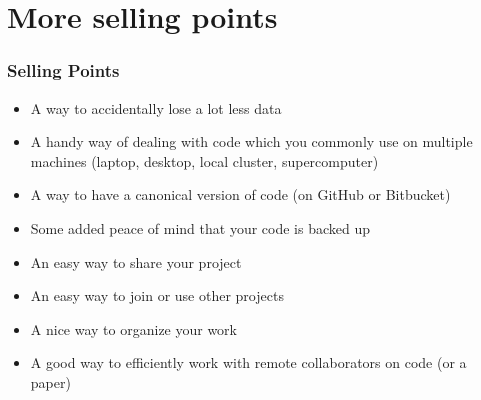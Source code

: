\documentclass{beamer}
\begin{document}
\section{More selling points}
\begin{frame}[fragile]
\frametitle{Selling Points}
\begin{itemize}
\item A way to accidentally lose a lot less data
\item A handy way of dealing with code which you commonly use on multiple machines (laptop, desktop, local cluster, supercomputer)
\item A way to have a canonical version of code (on GitHub or Bitbucket)
\item Some added peace of mind that your code is backed up
\item An easy way to share your project
\item An easy way to join or use other projects
\item A nice way to organize your work
\item A good way to efficiently work with remote collaborators on code (or a paper)
\end{itemize}
\end{frame}
\end{document}
